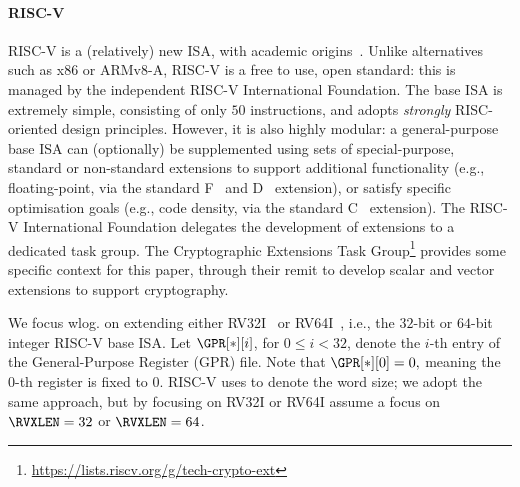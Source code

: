 
\paragraph{RISC-V}
\label{sec:bg:riscv}

RISC-V is a (relatively) new ISA, with academic origins~\cite{riscv:1,riscv:2}.
Unlike alternatives such as x86 or ARMv8-A, RISC-V is a free to use, 
open standard: this is managed by the independent
RISC-V International Foundation.
The base ISA is extremely simple, consisting of only $50$ instructions,
and adopts {\em strongly} RISC-oriented design principles.  However, it
is also highly modular: a general-purpose base ISA can (optionally) be
supplemented using sets of special-purpose, standard or non-standard
extensions to
support additional functionality 
(e.g., floating-point, 
       via the 
       standard F~\cite[Section 11]{RV:ISA:I:19}
                and
                D~\cite[Section 12]{RV:ISA:I:19}
       extension),
or 
satisfy specific optimisation goals
(e.g., code density, 
       via the 
       standard C~\cite[Section 16]{RV:ISA:I:19}
       extension).
The RISC-V International Foundation delegates the development of
extensions to a dedicated task group.
The Cryptographic Extensions Task
Group\footnote{
  \url{https://lists.riscv.org/g/tech-crypto-ext}
} provides some specific context for this paper, through their remit to 
develop scalar and vector extensions to support cryptography.

We focus wlog. on extending either
RV32I~\cite[Section 2]{RV:ISA:I:19}
or
RV64I~\cite[Section 5]{RV:ISA:I:19},
i.e., the
$32$-bit 
or
$64$-bit 
integer RISC-V base ISA.
Let $\GPR[*][ i ]$, for $0 \leq i < 32$, denote the $i$-th entry of the 
General-Purpose Register (GPR) file.  Note that 
$
\GPR[*][ 0 ] = 0 ,
$
meaning the $0$-th register is fixed to $0$.
RISC-V uses \RVXLEN to denote the word size; we adopt the same approach, 
but by focusing on 
RV32I 
or
RV64I 
assume a focus on 
$\RVXLEN = 32$
or
$\RVXLEN = 64$.

